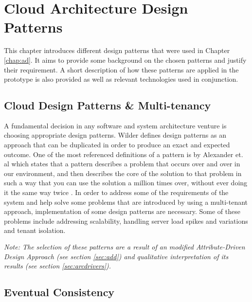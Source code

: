 \chapter{Cloud Architecture Design Patterns}

This chapter introduces different design patterns that were used in Chapter \ref{chap:ad}. It aims to provide some background on the chosen patterns and justify their requirement. A short description of how these patterns are applied in the prototype is also provided as well as relevant technologies used in conjunction.

\section{Cloud Design Patterns \& Multi-tenancy}

A fundamental decision in any software and system architecture venture is choosing appropriate design patterns. Wilder \cite{Wilder2012-so} defines design patterns as an approach that can be duplicated in order to produce an exact and expected outcome. One of the most referenced definitions of a pattern is by Alexander et. al which states that a pattern describes a problem that occurs over and over in our environment, and then describes the core of the solution to that problem in such a way that you can use the solution a million times over, without ever doing it the same way twice \cite{Alexander1977-ni}. In order to address some of the requirements of the system and help solve some problems that are introduced by using a multi-tenant approach, implementation of some design patterns are necessary. Some of these problems include addressing scalability, handling server load spikes and variations and tenant isolation. 

\textit{Note: The selection of these patterns are a result of an modified Attribute-Driven Design Approach (see section \ref{sec:add}) and qualitative interpretation of its results (see section \ref{sec:arcdrivers}).}

\section{Eventual Consistency}

